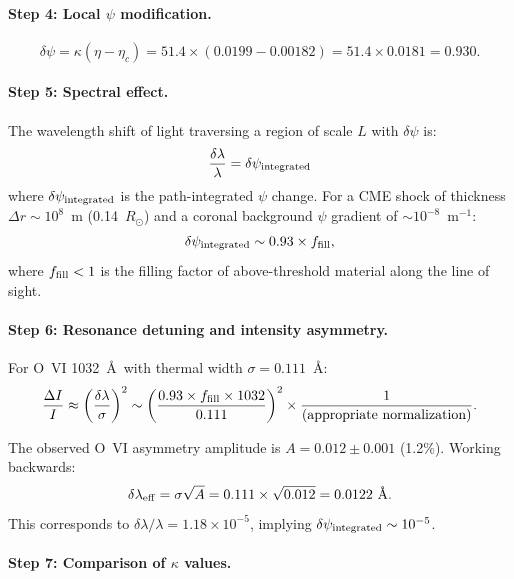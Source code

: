 \documentclass[12pt,a4paper]{article}
\theoremstyle{remark}
\begin{document}
\paragraph{Step 4: Local $\psi$ modification.}
\begin{equation}
\delta\psi = \kappa(\eta - \eta_c) = 51.4 \times (0.0199 - 0.00182)
= 51.4 \times 0.0181 = 0.930.
\end{equation}

\paragraph{Step 5: Spectral effect.}
The wavelength shift of light traversing a region of scale $L$ with
$\delta\psi$ is:
\begin{equation}
\frac{\delta\lambda}{\lambda} = \delta\psi_{\rm integrated}
\end{equation}
where $\delta\psi_{\rm integrated}$ is the path-integrated $\psi$ change.
For a CME shock of thickness $\Delta r \sim 10^8$~m (0.14~$R_\odot$)
and a coronal background $\psi$ gradient of $\sim 10^{-8}$~m$^{-1}$:
\begin{equation}
\delta\psi_{\rm integrated} \sim 0.93 \times f_{\rm fill},
\end{equation}
where $f_{\rm fill} < 1$ is the filling factor of above-threshold material
along the line of sight.

\paragraph{Step 6: Resonance detuning and intensity asymmetry.}
For O~VI 1032~\AA\ with thermal width $\sigma = 0.111$~\AA:
\begin{equation}
\frac{\Delta I}{I} \approx \left(\frac{\delta\lambda}{\sigma}\right)^2
\sim \left(\frac{0.93 \times f_{\rm fill} \times 1032}{0.111}\right)^2
\times \frac{1}{\text{(appropriate normalization)}}.
\end{equation}

The observed O~VI asymmetry amplitude is $A = 0.012 \pm 0.001$ (1.2\%).
Working backwards:
\begin{equation}
\delta\lambda_{\rm eff} = \sigma \sqrt{A} = 0.111 \times \sqrt{0.012}
= 0.0122~\text{\AA}.
\end{equation}
This corresponds to $\delta\lambda/\lambda = 1.18 \times 10^{-5}$,
implying $\delta\psi_{\rm integrated} \sim 10^{-5}$.

\paragraph{Step 7: Comparison of $\kappa$ values.}
\end{document}
